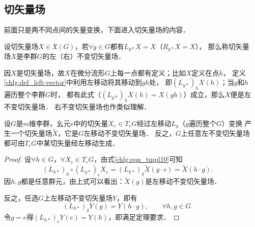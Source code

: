 \subsection{切矢量场}
前面只是两不同点间的矢量变换，下面进入切矢量场的内容．
\begin{definition}\label{chlg:def_left-vector}
    设切矢量场$X\in \mathfrak{X}(G)$，若$\forall g\in G$都有$L_{g*}X=X$（$R_{g*}X=X$），
    那么称切矢量场$X$是李群$G$的{\heiti 左（右）不变切矢量场}．
\end{definition}
因$X$是切矢量场，故$X$在微分流形$G$上每一点都有定义；比如$X$定义在点$h$，
定义\ref{chlg:def_left-vector}中利用左移动将其移动到$gh$处，
即$(L_{g*})_h X(h)$；当$g$和$h$遍历整个李群$G$时，
都有此式（$(L_{g*})_h X(h)=X(gh)$）成立，那么$X$便是左不变切矢量场．
右不变切矢量场也作类似理解．


\begin{theorem}\label{chlg:thm_lfv}
设$G$是$m$维李群，幺元$e$中的切矢量$X_e\in T_eG$经过左移动$L_g$（$g$遍历整个$G$）变换
产生一个切矢量场$\widetilde{X}$，它是$G$左移动不变切矢量场．
反之，$G$上任意左不变切矢量场都可由$T_eG$中某切矢量经左移动生成．
\end{theorem}
\begin{proof}
    设$\forall h\in G$，$\forall X_e\in T_eG$，由式\eqref{chlg:eqn_tmpl10}可知
    \begin{equation}
       (L_{h*})_g  \circ (L_{g*})_e  X_e = 
        (L_{h*})_g \widetilde{X}(g\cdot e) =\widetilde{X}(h \cdot g) .
    \end{equation}
    因$h,g$都是任意群元，由上式可以看出：$\widetilde{X}(g)$是左移动不变切矢量场．
    
    反之，任选$G$上左移动不变切矢量场${Y}$，即有
    \begin{equation}
       (L_{h*})_g {Y}(g) ={Y}(h \cdot g),\qquad \forall h,g\in G .
    \end{equation}
    令$g=e$得$(L_{h*})_e {Y}(e) ={Y}(h)$，即满足定理要求．
\end{proof}

